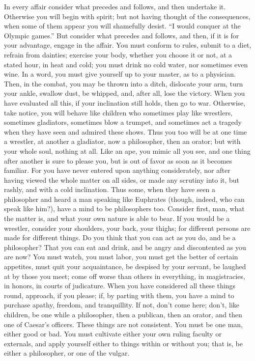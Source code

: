 In every affair consider what precedes and follows, and then undertake
it. Otherwise you will begin with spirit; but not having thought of
the consequences, when some of them appear you will shamefully desist.
``I would conquer at the Olympic games.'' But consider what precedes
and follows, and then, if it is for your advantage, engage in the
affair. You must conform to rules, submit to a diet, refrain from
dainties; exercise your body, whether you choose it or not, at a stated
hour, in heat and cold; you must drink no cold water, nor sometimes
even wine. In a word, you must give yourself up to your master, as
to a physician. Then, in the combat, you may be thrown into a ditch,
dislocate your arm, turn your ankle, swallow dust, be whipped, and,
after all, lose the victory. When you have evaluated all this, if
your inclination still holds, then go to war. Otherwise, take notice,
you will behave like children who sometimes play like wrestlers, sometimes
gladiators, sometimes blow a trumpet, and sometimes act a tragedy
when they have seen and admired these shows. Thus you too will be
at one time a wrestler, at another a gladiator, now a philosopher,
then an orator; but with your whole soul, nothing at all. Like an
ape, you mimic all you see, and one thing after another is sure to
please you, but is out of favor as soon as it becomes familiar. For
you have never entered upon anything considerately, nor after having
viewed the whole matter on all sides, or made any scrutiny into it,
but rashly, and with a cold inclination. Thus some, when they have
seen a philosopher and heard a man speaking like Euphrates (though,
indeed, who can speak like him?), have a mind to be philosophers too.
Consider first, man, what the matter is, and what your own nature
is able to bear. If you would be a wrestler, consider your shoulders,
your back, your thighs; for different persons are made for different
things. Do you think that you can act as you do, and be a philosopher?
That you can eat and drink, and be angry and discontented as you are
now? You must watch, you must labor, you must get the better of certain
appetites, must quit your acquaintance, be despised by your servant,
be laughed at by those you meet; come off worse than others in everything,
in magistracies, in honors, in courts of judicature. When you have
considered all these things round, approach, if you please; if, by
parting with them, you have a mind to purchase apathy, freedom, and
tranquillity. If not, don't come here; don't, like children, be one
while a philosopher, then a publican, then an orator, and then one
of Caesar's officers. These things are not consistent. You must be
one man, either good or bad. You must cultivate either your own ruling
faculty or externals, and apply yourself either to things within or
without you; that is, be either a philosopher, or one of the vulgar.

